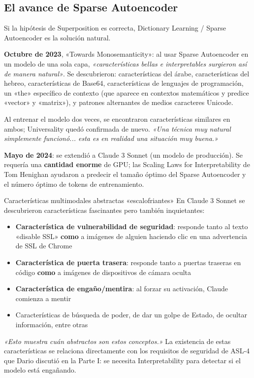 \documentclass[a4paper]{article}
\begin{document}
\subsection{El avance de Sparse Autoencoder}

Si la hipótesis de Superposition es correcta, Dictionary Learning / Sparse Autoencoder es la solución natural.

\textbf{Octubre de 2023}, «Towards Monosemanticity»: al usar Sparse Autoencoder en un modelo de una sola capa, \textit{«características bellas e interpretables surgieron así de manera natural»}. Se descubrieron: características del árabe, características del hebreo, características de Base64, características de lenguajes de programación, un «the» específico de contexto (que aparece en contextos matemáticos y predice «vector» y «matrix»), y patrones alternantes de medios caracteres Unicode.

Al entrenar el modelo dos veces, se encontraron características similares en ambos; Universality quedó confirmada de nuevo. \textit{«Una técnica muy natural simplemente funcionó... esta es en realidad una situación muy buena.»}

\textbf{Mayo de 2024}: se extendió a Claude 3 Sonnet (un modelo de producción). Se requería una \textbf{cantidad enorme} de GPU; las Scaling Laws for Interpretability de Tom Henighan ayudaron a predecir el tamaño óptimo del Sparse Autoencoder y el número óptimo de tokens de entrenamiento.

\begin{warningbox}{Características multimodales abstractas «escalofriantes»}
En Claude 3 Sonnet se descubrieron características fascinantes pero también inquietantes:

\begin{itemize}
    \item \textbf{Característica de vulnerabilidad de seguridad}: responde tanto al texto «disable SSL» \textbf{como} a imágenes de alguien haciendo clic en una advertencia de SSL de Chrome
    \item \textbf{Característica de puerta trasera}: responde tanto a puertas traseras en código \textbf{como} a imágenes de dispositivos de cámara oculta
    \item \textbf{Característica de engaño/mentira}: al forzar su activación, Claude comienza a mentir
    \item Características de búsqueda de poder, de dar un golpe de Estado, de ocultar información, entre otras
\end{itemize}

\textit{«Esto muestra cuán abstractos son estos conceptos.»} La existencia de estas características se relaciona directamente con los requisitos de seguridad de ASL-4 que Dario discutió en la Parte I: se necesita Interpretability para detectar si el modelo está engañando.
\end{warningbox}
\end{document}
